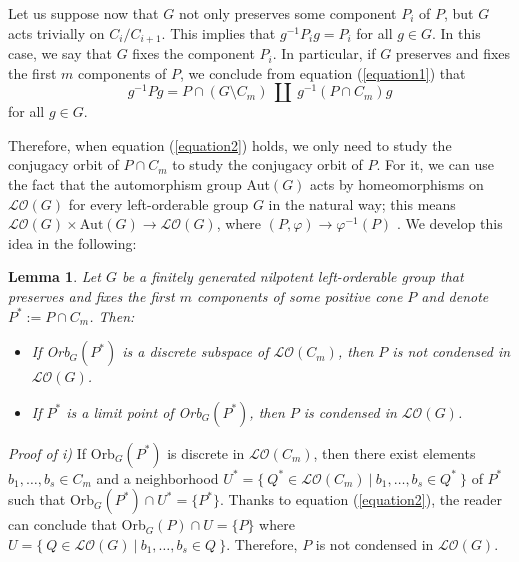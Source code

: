 \documentclass[12pt]{article}
\newtheorem{lem}{Lemma}
\theoremstyle{definition}
\begin{document}
Let us suppose now that $G$ not only preserves some component $P_i$ of $P$, but $G$ acts trivially on $C_i/C_{i+1}$. This implies that $g^{-1}P_ig=P_i$ for all $g\in G$. In this case, we say that $G$ fixes the component $P_i$.
In particular, if $G$ preserves and fixes the first $m$ components of $P$, we conclude from equation (\ref{equation1}) that
\begin{equation}
\label{equation2}
g^{-1}Pg=P\cap (G\setminus C_m)\ \amalg\ g^{-1}(P\cap C_m)g  
\end{equation}
for all $g\in G$. 

Therefore, when equation (\ref{equation2}) holds, we only need to study the conjugacy orbit of $P\cap C_m$  to study the conjugacy orbit of $P$. For it, we can use the fact that the automorphism group Aut$(G)$ acts by homeomorphisms on $\mathcal{LO}(G)$ for every left-orderable group $G$ in the natural way; this means $\mathcal{LO}(G)\times \text{Aut}(G)\rightarrow \mathcal{LO}(G)$, where $(P,\varphi)\rightarrow \varphi^{-1}(P)$ \cite[Chapter 10]{ClayRolfsen}. %
We develop this idea in the following:

\begin{lem}
\label{dico}
Let $G$ be a finitely generated nilpotent left-orderable group that preserves and fixes the first $m$ components of some positive cone $P$ and denote $P^*:=P\cap C_m$. Then:
\begin{itemize}
    \item[i)] If Orb$_G(P^*)$ is a discrete subspace of $\mathcal{LO}(C_m)$, then $P$ is not condensed in $\mathcal{LO}(G)$. 
    \item[ii)] If $P^*$ is a limit point of Orb$_G(P^*)$, then $P$ is condensed in $\mathcal{LO}(G)$.
\end{itemize}
\end{lem}

    \indent\textit{Proof of i)} If Orb$_G(P^*)$ is discrete in $\mathcal{LO}(C_m)$, then there exist elements $b_1,\dots, b_s\in C_m$ and a neighborhood $U^*=\{\ Q^*\in \mathcal{LO}(C_m)\ |\ b_1,\dots, b_s\in Q^*\ \}$ of $P^*$ such that Orb$_G(P^*)\cap U^*=\{P^*\}$.
    Thanks to equation (\ref{equation2}), the reader can conclude that Orb$_G(P)\cap U=\{P\}$
    where $U=\{\ Q\in \mathcal{LO}(G)\ |\ b_1,\dots, b_s\in Q\ \}$. Therefore, $P$ is not condensed in $\mathcal{LO}(G).$
    \\
\end{document}
